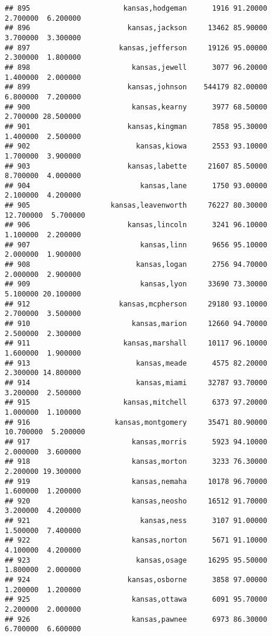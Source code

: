 \documentclass[
]{article}
\begin{document}
\begin{verbatim}
## 895                      kansas,hodgeman      1916 91.20000  2.700000  6.200000
## 896                       kansas,jackson     13462 85.90000  3.700000  3.300000
## 897                     kansas,jefferson     19126 95.00000  2.300000  1.800000
## 898                        kansas,jewell      3077 96.20000  1.400000  2.000000
## 899                       kansas,johnson    544179 82.00000  6.800000  7.200000
## 900                        kansas,kearny      3977 68.50000  2.700000 28.500000
## 901                       kansas,kingman      7858 95.30000  1.400000  2.500000
## 902                         kansas,kiowa      2553 93.10000  1.700000  3.900000
## 903                       kansas,labette     21607 85.50000  8.700000  4.000000
## 904                          kansas,lane      1750 93.00000  2.100000  4.200000
## 905                   kansas,leavenworth     76227 80.30000 12.700000  5.700000
## 906                       kansas,lincoln      3241 96.10000  1.100000  2.200000
## 907                          kansas,linn      9656 95.10000  2.000000  1.900000
## 908                         kansas,logan      2756 94.70000  2.000000  2.900000
## 909                          kansas,lyon     33690 73.30000  5.100000 20.100000
## 912                     kansas,mcpherson     29180 93.10000  2.700000  3.500000
## 910                        kansas,marion     12660 94.70000  2.500000  2.300000
## 911                      kansas,marshall     10117 96.10000  1.600000  1.900000
## 913                         kansas,meade      4575 82.20000  2.300000 14.800000
## 914                         kansas,miami     32787 93.70000  3.200000  2.500000
## 915                      kansas,mitchell      6373 97.20000  1.000000  1.100000
## 916                    kansas,montgomery     35471 80.90000 10.700000  5.200000
## 917                        kansas,morris      5923 94.10000  2.000000  3.600000
## 918                        kansas,morton      3233 76.30000  2.200000 19.300000
## 919                        kansas,nemaha     10178 96.70000  1.600000  1.200000
## 920                        kansas,neosho     16512 91.70000  3.200000  4.200000
## 921                          kansas,ness      3107 91.00000  1.500000  7.400000
## 922                        kansas,norton      5671 91.10000  4.100000  4.200000
## 923                         kansas,osage     16295 95.50000  1.800000  2.000000
## 924                       kansas,osborne      3858 97.00000  1.200000  1.200000
## 925                        kansas,ottawa      6091 95.70000  2.200000  2.000000
## 926                        kansas,pawnee      6973 86.30000  6.700000  6.600000

\end{verbatim}
\end{document}
